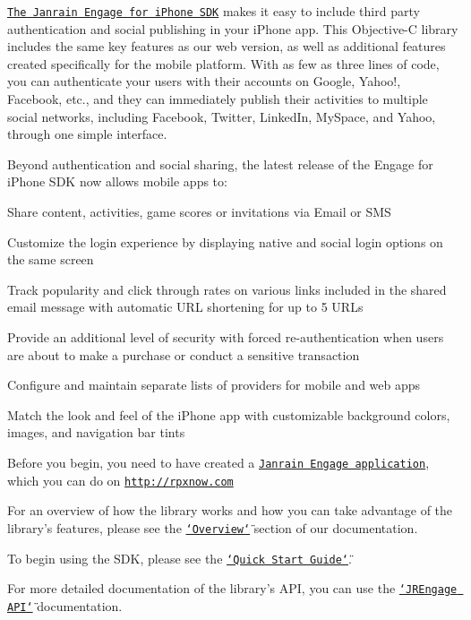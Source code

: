 \href{http://rpxnow.com/docs/iphone}{\tt The Janrain Engage for iPhone SDK} makes it easy to include third party authentication and social publishing in your iPhone app. This Objective-\/C library includes the same key features as our web version, as well as additional features created specifically for the mobile platform. With as few as three lines of code, you can authenticate your users with their accounts on Google, Yahoo!, Facebook, etc., and they can immediately publish their activities to multiple social networks, including Facebook, Twitter, LinkedIn, MySpace, and Yahoo, through one simple interface.

Beyond authentication and social sharing, the latest release of the Engage for iPhone SDK now allows mobile apps to:
\begin{DoxyItemize}
\item Share content, activities, game scores or invitations via Email or SMS
\item Customize the login experience by displaying native and social login options on the same screen
\item Track popularity and click through rates on various links included in the shared email message with automatic URL shortening for up to 5 URLs
\item Provide an additional level of security with forced re-\/authentication when users are about to make a purchase or conduct a sensitive transaction
\item Configure and maintain separate lists of providers for mobile and web apps
\item Match the look and feel of the iPhone app with customizable background colors, images, and navigation bar tints
\end{DoxyItemize}

Before you begin, you need to have created a \href{https://rpxnow.com/signup_createapp_plus}{\tt Janrain Engage application}, which you can do on \href{http://rpxnow.com}{\tt http://rpxnow.com}

For an overview of how the library works and how you can take advantage of the library's features, please see the \href{http://rpxnow.com/docs/iphone#user_experience}{\tt \char`\"{}Overview\char`\"{}} section of our documentation.

To begin using the SDK, please see the \href{http://rpxnow.com/docs/iphone#quick}{\tt \char`\"{}Quick Start Guide\char`\"{}}.

For more detailed documentation of the library's API, you can use the \href{http://rpxnow.com/docs/iphone_api/annotated.html}{\tt \char`\"{}JREngage API\char`\"{}} documentation. 